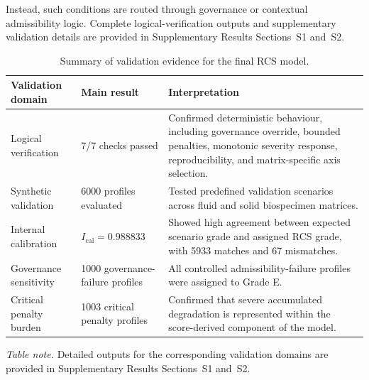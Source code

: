 \documentclass[preprint,12pt]{elsarticle}
\renewcommand{\arraystretch}{1.15}
\begin{document}
Instead, such conditions are routed through governance or contextual admissibility logic. Complete logical-verification outputs and 
supplementary validation details are provided in Supplementary Results Sections~S1 and~S2.

\begin{table}[!htbp]
\caption{Summary of validation evidence for the final RCS model.}
\label{tab:validation_summary}

\footnotesize
\setlength{\tabcolsep}{4.5pt}
\renewcommand{\arraystretch}{1.22}

\begin{tabular}{@{}p{3.4cm}p{3.7cm}p{5.4cm}@{}}

\toprule
\textbf{Validation domain}
& \textbf{Main result}
& \textbf{Interpretation} \\
\midrule

Logical verification
& 7/7 checks passed
& Confirmed deterministic behaviour, including governance override, bounded penalties, monotonic severity response, reproducibility, and 
matrix-specific axis selection. \\

Synthetic validation
& 6000 profiles evaluated
& Tested predefined validation scenarios across fluid and solid biospecimen matrices. \\

Internal calibration
& \(I_{\mathrm{cal}}=0.988833\)
& Showed high agreement between expected scenario grade and assigned RCS grade, with 5933 matches and 67 mismatches. \\

Governance sensitivity
& 1000 governance-failure profiles
& All controlled admissibility-failure profiles were assigned to Grade E. \\

Critical penalty burden
& 1003 critical penalty profiles
& Confirmed that severe accumulated degradation is represented within the score-derived component of the model. \\

\bottomrule

\end{tabular}

\vspace{0.35em}

\noindent\footnotesize{
\textit{Table note.}
Detailed outputs for the corresponding validation domains are provided in Supplementary Results Sections~S1 and~S2.
}
\end{table}
\end{document}
